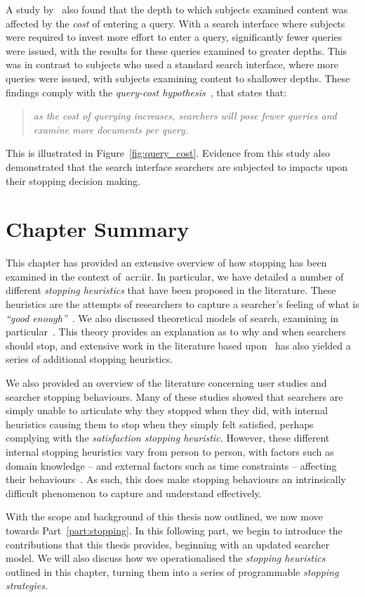 A study by~\cite{azzopardi2013query_cost} also found that the depth to which subjects examined content was affected by the \emph{cost} of entering a query. With a search interface where subjects were required to invest more effort to enter a query, significantly fewer queries were issued, with the results for these queries examined to greater depths. This was in contrast to subjects who used a standard search interface, where more queries were issued, with subjects examining content to shallower depths. These findings comply with the \emph{query-cost hypothesis}~\citep{azzopardi2011economics}, that states that:

\begin{quote}
    \emph{as the cost of querying increases, searchers will pose fewer queries and examine more documents per query.}
\end{quote}

This is illustrated in Figure~\ref{fig:query_cost}. Evidence from this study also demonstrated that the search interface searchers are subjected to impacts upon their stopping decision making.

\section{Chapter Summary}
This chapter has provided an extensive overview of how stopping has been examined in the context of~\gls{acr:iir}. In particular, we have detailed a number of different \emph{stopping heuristics} that have been proposed in the literature. These heuristics are the attempts of researchers to capture a searcher's feeling of what is \emph{``good enough''}~\citep{zach2005enough_is_enough}. We also discussed theoretical models of search, examining in particular~. This theory provides an explanation as to why and when searchers should stop, and extensive work in the literature based upon~ has also yielded a series of additional stopping heuristics.

We also provided an overview of the literature concerning user studies and searcher stopping behaviours. Many of these studies showed that searchers are simply unable to articulate why they stopped when they did, with internal heuristics causing them to stop when they simply felt satisfied, perhaps complying with the \emph{satisfaction stopping heuristic.} However, these different internal stopping heuristics vary from person to person, with factors such as domain knowledge -- and external factors such as time constraints -- affecting their behaviours~\citep{marchionini1995information_seeking}. As such, this does make stopping behaviours an intrinsically difficult phenomenon to capture and understand effectively.

With the scope and background of this thesis now outlined, we now move towards Part~\ref{part:stopping}. In this following part, we begin to introduce the contributions that this thesis provides, beginning with an updated searcher model. We will also discuss how we operationalised the \emph{stopping heuristics} outlined in this chapter, turning them into a series of programmable \emph{stopping strategies.}